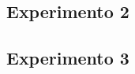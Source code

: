 \documentclass[12pt, letterpaper]{article}
\begin{document}
\subsection{Experimento 2}

\subsection{Experimento 3}




\end{document}
